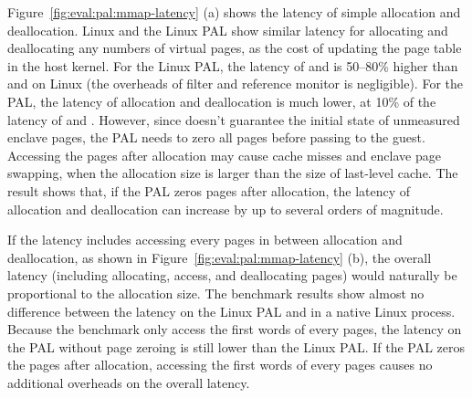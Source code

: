 Figure~\ref{fig:eval:pal:mmap-latency} (a)
shows the latency of
simple allocation and deallocation.
Linux and the Linux PAL
show similar latency for allocating and deallocating any numbers
of virtual pages,
as the cost of updating the page table
in the host kernel.
For the Linux PAL, the latency
of  and   is 50--80\% higher
than  and  on Linux
(the overheads of \seccomp{} filter and reference monitor is negligible).
For the \sgx{} PAL,
the latency of allocation and deallocation
is much lower,
at \roughly{}10\% of the latency of  and .
However,
since \sgx{} doesn't guarantee the initial state of unmeasured enclave pages,
the \sgx{} PAL needs to zero all pages
before passing to the guest.
Accessing the pages after allocation
may cause cache misses and enclave page swapping,
when the allocation size
is larger than the size of last-level cache.
The result shows that,
if the \sgx{} PAL zeros pages after allocation,
the latency of allocation and deallocation can increase by up to several orders of magnitude.



If the latency includes accessing every pages in between allocation and deallocation,
as shown in Figure~\ref{fig:eval:pal:mmap-latency} (b),
the overall latency (including allocating, access, and deallocating pages) would
naturally be proportional to the allocation size.
The benchmark results show almost no difference
between the latency on the Linux PAL and in a native Linux process.
Because the benchmark only access the first words
of every pages,
the latency on the \sgx{} PAL without page zeroing
is still lower than the Linux PAL.
If the \sgx{} PAL zeros the pages after allocation,
accessing the first words
of every pages causes no additional overheads
on the overall latency.




